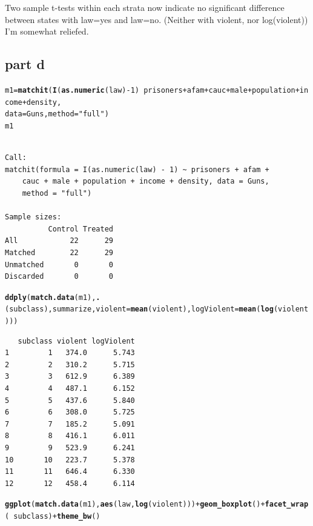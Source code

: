 \documentclass{article}\usepackage{graphicx, color}
\makeatletter
\newcommand{\hlfunctioncall}[1]{\textcolor[rgb]{0.501960784313725,0,0.329411764705882}{\textbf{#1}}}%
\newcommand{\hlstring}[1]{\textcolor[rgb]{0.6,0.6,1}{#1}}%
\newenvironment{kframe}{%
 \def\at@end@of@kframe{}%
 \ifinner\ifhmode%
  \def\at@end@of@kframe{\end{minipage}}%
  \begin{minipage}{\columnwidth}%
 \fi\fi%
 \def\FrameCommand##1{\hskip\@totalleftmargin \hskip-\fboxsep
 \colorbox{shadecolor}{##1}\hskip-\fboxsep
     \hskip-\linewidth \hskip-\@totalleftmargin \hskip\columnwidth}%
 \MakeFramed {\advance\hsize-\width
   \@totalleftmargin\z@ \linewidth\hsize
   \@setminipage}}%
 {\par\unskip\endMakeFramed%
 \at@end@of@kframe}
\newenvironment{knitrout}{}{} %
\makeatother
\begin{document}
Two sample t-tests within each strata now indicate no significant difference between states with law=yes and law=no. (Neither with violent, nor log(violent))
I'm somewhat reliefed.

\subsection*{part d}

\begin{knitrout}
\color{fgcolor}\begin{kframe}
\begin{alltt}
m1=\hlfunctioncall{matchit}(\hlfunctioncall{I}(\hlfunctioncall{as.numeric}(law)-1)~prisoners+afam+cauc+male+population+income+density, 
           data=Guns, method=\hlstring{"full"})
m1
\end{alltt}
\begin{verbatim}

Call: 
matchit(formula = I(as.numeric(law) - 1) ~ prisoners + afam + 
    cauc + male + population + income + density, data = Guns, 
    method = "full")

Sample sizes:
          Control Treated
All            22      29
Matched        22      29
Unmatched       0       0
Discarded       0       0

\end{verbatim}
\begin{alltt}
\hlfunctioncall{ddply}(\hlfunctioncall{match.data}(m1), \hlfunctioncall{.}(subclass), summarize, violent=\hlfunctioncall{mean}(violent), logViolent=\hlfunctioncall{mean}(\hlfunctioncall{log}(violent)))
\end{alltt}
\begin{verbatim}
   subclass violent logViolent
1         1   374.0      5.743
2         2   310.2      5.715
3         3   612.9      6.389
4         4   487.1      6.152
5         5   437.6      5.840
6         6   308.0      5.725
7         7   185.2      5.091
8         8   416.1      6.011
9         9   523.9      6.241
10       10   223.7      5.378
11       11   646.4      6.330
12       12   458.4      6.114
\end{verbatim}
\begin{alltt}
\hlfunctioncall{ggplot}(\hlfunctioncall{match.data}(m1), \hlfunctioncall{aes}(law,\hlfunctioncall{log}(violent)))+\hlfunctioncall{geom_boxplot}()+\hlfunctioncall{facet_wrap}(~subclass)+\hlfunctioncall{theme_bw}()
\end{alltt}
\end{kframe}


\end{knitrout}
\end{document}
